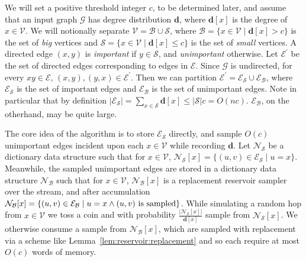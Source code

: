 \documentclass[10]{report}
\begin{document}

We will set a positive threshold integer $c$, to be determined later, and assume that an input graph $\mathcal{G}$ has degree distribution $\mathbf{d}$, where $\mathbf{d}[x]$ is the degree of $x \in \mathcal{V}$. 
We will notionally separate $\mathcal{V} = \mathcal{B} \cup \mathcal{S}$, where $\mathcal{B} = \{x \in \mathcal{V} \mid \mathbf{d}[x] > c \}$ is the set of \emph{big} vertices and $\mathcal{S} = \{x \in \mathcal{V} \mid \mathbf{d}[x] \leq c\}$ is the set of \emph{small} vertices.
A directed edge $(x, y)$ is \emph{important} if $y \in \mathcal{S}$, and \emph{unimportant} otherwise.
Let $\mathcal{E}^\prime$ be the set of directed edges corresponding to edges in $\mathcal{E}$. 
Since $\mathcal{G}$ is undirected, for every $xy \in \mathcal{E}$, $(x, y), (y, x) \in \mathcal{E}^\prime$.
Then we can partition $\mathcal{E}^\prime = \mathcal{E}_\mathcal{S} \cup \mathcal{E}_\mathcal{B}$, where $\mathcal{E}_\mathcal{S}$ is the set of important edges and $\mathcal{E}_\mathcal{B}$ is the set of unimportant edges. 
Note in particular that by definition $|\mathcal{E}_\mathcal{S}| = \sum_{x \in \mathcal{S}} \mathbf{d}[x] \leq |\mathcal{S}|c = O(nc)$.
$\mathcal{E}_\mathcal{B}$, on the otherhand, may be quite large.

The core idea of the algorithm is to store $\mathcal{E}_\mathcal{S}$ directly, and sample $O(c)$ unimportant edges incident upon each $x \in \mathcal{V}$ while recording $\mathbf{d}$.
Let $\mathcal{N}_\mathcal{S}$ be a dictionary data structure such that for $x \in \mathcal{V}$, $\mathcal{N}_\mathcal{S}[x] = \{(u, v) \in \mathcal{E}_\mathcal{S} \mid u = x \}$.
Meanwhile, the sampled unimportant edges are stored in a dictionary data structure $\mathcal{N}_\mathcal{B}$ such that for $x \in \mathcal{V}$, $\mathcal{N}_\mathcal{B}[x]$ is a replacement reservoir sampler over the stream, and after accumulation  $\mathcal{N}_\mathcal{B}[x]= \{(u, v) \in \mathcal{E}_\mathcal{B} \mid u = x \wedge \textnormal{$(u, v)$ is sampled} \}$.
While simulating a random hop from $x \in \mathcal{V}$ we toss a coin and with probability $\frac{|\mathcal{N}_\mathcal{S}[x]|}{\mathbf{d}[x]}$ sample from $\mathcal{N}_\mathcal{S}[x]$.
We otherwise consume a sample from $\mathcal{N}_\mathcal{B}[x]$, which are sampled with replacement via a scheme like Lemma~\ref{lem:reservoir:replacement} and so each require at most $O(c)$ words of memory.
\end{document}
